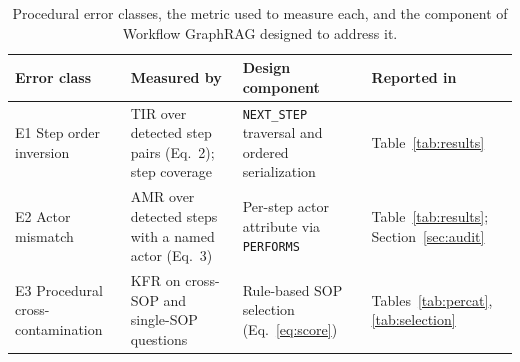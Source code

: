 

\begin{table}[!htbp]
\centering
\caption{Procedural error classes, the metric used to measure each, and the component of Workflow GraphRAG designed to address it.}
\label{tab:errormap}
\small
\setlength{\tabcolsep}{4pt}
\begin{tabularx}{\textwidth}{>{\raggedright\arraybackslash}p{2.6cm} >{\raggedright\arraybackslash}X >{\raggedright\arraybackslash}p{3.6cm} >{\raggedright\arraybackslash}p{3.0cm}}
\toprule
Error class & Measured by & Design component & Reported in \\
\midrule
E1 Step order inversion & TIR over detected step pairs (Eq.~2); step coverage & \texttt{NEXT\_STEP} traversal and ordered serialization & Table~\ref{tab:results} \\
E2 Actor mismatch & AMR over detected steps with a named actor (Eq.~3) & Per-step actor attribute via \texttt{PERFORMS} & Table~\ref{tab:results}; Section~\ref{sec:audit} \\
E3 Procedural cross-contamination & KFR on cross-SOP and single-SOP questions & Rule-based SOP selection (Eq.~\eqref{eq:score}) & Tables~\ref{tab:percat}, \ref{tab:selection} \\
\bottomrule
\end{tabularx}
\end{table}

